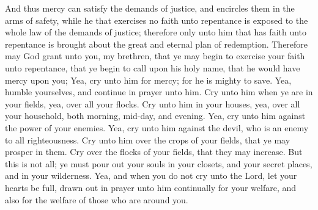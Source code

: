 And thus mercy can satisfy the demands of justice, and encircles them in the arms of safety, while he that exercises no faith unto repentance is exposed to the whole law of the demands of justice; therefore only unto him that has faith unto repentance is brought about the great and eternal plan of redemption.
\bverse \iffalse Therefore may God grant unto you, my brethren, that ye may begin to exercise your faith unto repentance, that ye begin to call upon his holy name, that he would have mercy upon you; \fi
Therefore may God grant unto you, my brethren, that ye may begin to exercise your faith unto repentance, that ye begin to call upon his holy name, that he would have mercy upon you;
\bverse \iffalse Yea, cry unto him for mercy; for he is mighty to save. \fi
Yea, cry unto him for mercy; for he is mighty to save.
\bverse \iffalse Yea, humble yourselves, and continue in prayer unto him. \fi
Yea, humble yourselves, and continue in prayer unto him.
\bverse \iffalse Cry unto him when ye are in your fields, yea, over all your flocks. \fi
Cry unto him when ye are in your fields, yea, over all your flocks.
\bverse \iffalse Cry unto him in your houses, yea, over all your household, both morning, mid-day, and evening. \fi
Cry unto him in your houses, yea, over all your household, both morning, mid-day, and evening.
\bverse \iffalse Yea, cry unto him against the power of your enemies. \fi
Yea, cry unto him against the power of your enemies.
\bverse \iffalse Yea, cry unto him against the devil, who is an enemy to all righteousness. \fi
Yea, cry unto him against the devil, who is an enemy to all righteousness.
\bverse \iffalse Cry unto him over the crops of your fields, that ye may prosper in them. \fi
Cry unto him over the crops of your fields, that ye may prosper in them.
\bverse \iffalse Cry over the flocks of your fields, that they may increase. \fi
Cry over the flocks of your fields, that they may increase.
\bverse \iffalse But this is not all; ye must pour out your souls in your closets, and your secret places, and in your wilderness. \fi
But this is not all; ye must pour out your souls in your closets, and your secret places, and in your wilderness.
\bverse \iffalse Yea, and when you do not cry unto the Lord, let your hearts be full, drawn out in prayer unto him continually for your welfare, and also for the welfare of those who are around you. \fi
Yea, and when you do not cry unto the Lord, let your hearts be full, drawn out in prayer unto him continually for your welfare, and also for the welfare of those who are around you.
